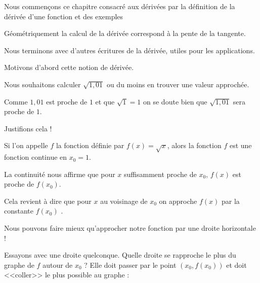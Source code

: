







\debuttexte

\diapo

\change

\change

Nous commençons ce chapitre consacré aux dérivées par la définition
de la dérivée d'une fonction et des exemples

\change

Géométriquement la calcul de la dérivée correspond à la pente de la tangente.

\change

Nous terminons avec d'autres écritures de la dérivée, utiles pour les applications.

\diapo

Motivons d'abord cette notion de dérivée.

Nous souhaitons calculer $\sqrt{1,01}$ ou du moins en trouver une valeur approchée.

\change

Comme $1,01$ est proche de $1$ et que $\sqrt{1}=1$ on se doute bien que $\sqrt{1,01}$
sera proche de $1$. 

Justifions cela !

\change

Si l'on appelle $f$ la fonction définie par $f(x)=\sqrt{x}$, alors la fonction $f$ est une fonction 
continue en $x_0=1$. 

\change

La continuité nous affirme que pour $x$ suffisamment proche de $x_0$,  
$f(x)$ est proche de $f(x_0)$. 

Cela revient à dire que pour $x$ au voisinage de $x_0$ on approche $f(x)$
par la constante $f(x_0)$ .

\change

Nous pouvons faire mieux qu'approcher notre fonction par une droite horizontale ! 

Essayons avec une droite quelconque. Quelle droite se rapproche le plus du graphe de $f$ autour de $x_0$ ? 
Elle doit passer par le point $(x_0,f(x_0))$ et doit <<coller>> le plus possible au graphe : 

